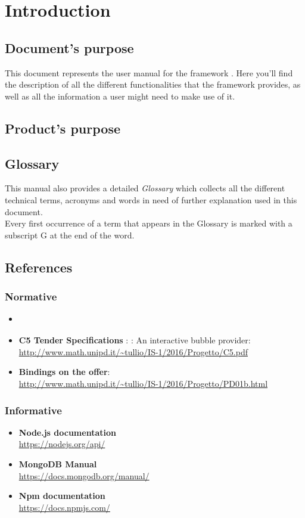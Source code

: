 \section{Introduction}

\subsection{Document's purpose}
This document represents the user manual for the framework \ProjectName{}. Here you'll find the description of all the different functionalities that the framework provides, as well as all the information a user might need to make use of it.


\subsection{Product's purpose}
\ScopoDelProdottoEng{}

\subsection{Glossary}
This manual also provides a detailed \textit{Glossary} which collects all the different technical terms, acronyms and words in need of further explanation used in this document.\\
Every first occurrence of a term that appears in the Glossary is marked with a subscript G at the end of the word.

\subsection{References}
\subsubsection{Normative}
\begin{itemize}
	\item \textbf{\NormeDiProgetto}
	\item\textbf{C5 Tender Specifications }: \ProjectName{}: An interactive bubble provider:\\ \url{http://www.math.unipd.it/~tullio/IS-1/2016/Progetto/C5.pdf}
	\item \textbf{Bindings on the offer}: \\ \url{http://www.math.unipd.it/~tullio/IS-1/2016/Progetto/PD01b.html}
\end{itemize}

\subsubsection{Informative}
\begin{itemize}
	\item \textbf{Node.js documentation}
	\\ \url{https://nodejs.org/api/}
	\item \textbf{MongoDB Manual}
	\\ \url{https://docs.mongodb.org/manual/}
	\item \textbf{Npm documentation}
	\\ \url{https://docs.npmjs.com/}
\end{itemize}
